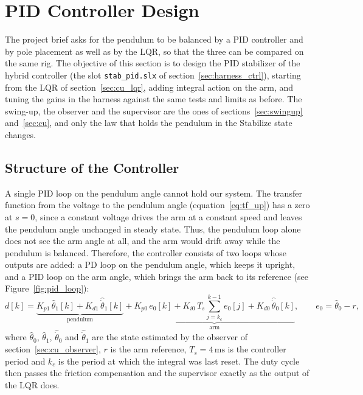 \documentclass[a4paper,11pt]{article}
\begin{document}
\section{PID Controller Design}
\label{sec:pid}
The project brief asks for the pendulum to be balanced by a PID controller and by pole placement as well as by the LQR, so that the three can be compared on the same rig. The objective of this section is to design the PID stabilizer of the hybrid controller (the slot \texttt{stab\_pid.slx} of section~\ref{sec:harness_ctrl}), starting from the LQR of section~\ref{sec:cu_lqr}, adding integral action on the arm, and tuning the gains in the harness against the same tests and limits as before. The swing-up, the observer and the supervisor are the ones of sections~\ref{sec:swingup} and~\ref{sec:cu}, and only the law that holds the pendulum in the Stabilize state changes.

\subsection{Structure of the Controller}
\label{sec:pid_structure}
A single PID loop on the pendulum angle cannot hold our system. The transfer function from the voltage to the pendulum angle (equation~\ref{eq:tf_up}) has a zero at $s = 0$, since a constant voltage drives the arm at a constant speed and leaves the pendulum angle unchanged in steady state. Thus, the pendulum loop alone does not see the arm angle at all, and the arm would drift away while the pendulum is balanced. Therefore, the controller consists of two loops whose outputs are added: a PD loop on the pendulum angle, which keeps it upright, and a PID loop on the arm angle, which brings the arm back to its reference (see Figure~\ref{fig:pid_loop}):
\begin{equation}
  d[k] = \underbrace{K_{p1}\,\hat\theta_1[k] + K_{d1}\,\hat{\dot\theta}_1[k]}_{\text{pendulum}}
       + \underbrace{K_{p0}\,e_0[k] + K_{i0}\,T_s \sum_{j=k_c}^{k-1} e_0[j] + K_{d0}\,\hat{\dot\theta}_0[k]}_{\text{arm}},
  \qquad e_0 = \hat\theta_0 - r ,
  \label{eq:pid_law}
\end{equation}
where $\hat\theta_0$, $\hat\theta_1$, $\hat{\dot\theta}_0$ and $\hat{\dot\theta}_1$ are the state estimated by the observer of section~\ref{sec:cu_observer}, $r$ is the arm reference, $T_s = 4\,\mathrm{ms}$ is the controller period and $k_c$ is the period at which the integral was last reset. The duty cycle then passes the friction compensation and the supervisor exactly as the output of the LQR does.
\end{document}
